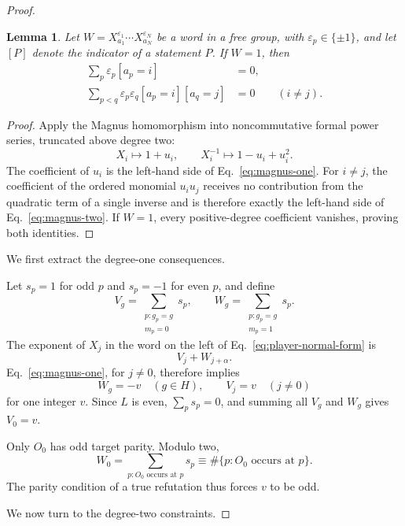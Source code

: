 \documentclass[11pt]{article}
\newtheorem{lemma}[theorem]{Lemma}
\theoremstyle{definition}
\theoremstyle{remark}
\numberwithin{equation}{section}
\begin{document}
\begin{proof}
\begin{lemma}\label{lem:magnus-conditions}
Let \(W=X_{a_1}^{\varepsilon_1}\cdots
X_{a_N}^{\varepsilon_N}\) be a word in a free group, with
\(\varepsilon_p\in\{\pm1\}\), and let \([P]\) denote the indicator of a
statement \(P\).  If \(W=1\), then
\begin{align}
  \sum_p\varepsilon_p[a_p=i]&=0,
  \label{eq:magnus-one}\\
  \sum_{p<q}\varepsilon_p\varepsilon_q
  [a_p=i][a_q=j]&=0
  \qquad(i\ne j).
  \label{eq:magnus-two}
\end{align}
\end{lemma}

\begin{proof}
Apply the Magnus homomorphism into noncommutative formal power series,
truncated above degree two:
\[
  X_i\longmapsto1+u_i,
  \qquad
  X_i^{-1}\longmapsto1-u_i+u_i^2.
\]
The coefficient of \(u_i\) is the left-hand side of
Eq.~\eqref{eq:magnus-one}.  For \(i\ne j\), the coefficient of the ordered
monomial \(u_i u_j\) receives no contribution from the quadratic term of a
single inverse and is therefore exactly the left-hand side of
Eq.~\eqref{eq:magnus-two}.  If \(W=1\), every positive-degree coefficient
vanishes, proving both identities.
\end{proof}

We first extract the degree-one consequences.

Let \(s_p=1\) for odd \(p\) and \(s_p=-1\) for even \(p\), and define
\[
  V_g=\sum_{\substack{p:g_p=g\\m_p=0}}s_p,
  \qquad
  W_g=\sum_{\substack{p:g_p=g\\m_p=1}}s_p.
\]
The exponent of \(X_j\) in the word on the left of
Eq.~\eqref{eq:player-normal-form} is
\[
  V_j+W_{j+\alpha}.
\]
Eq.~\eqref{eq:magnus-one}, for \(j\ne0\), therefore implies
\[
  W_g=-v\quad(g\in H),
  \qquad
  V_j=v\quad(j\ne0)
\]
for one integer \(v\).  Since \(L\) is even,
\(\sum_p s_p=0\), and summing all \(V_g\) and \(W_g\) gives \(V_0=v\).

Only \(O_0\) has odd target parity.  Modulo two,
\[
  W_0
  =
  \sum_{p:O_0\text{ occurs at }p}s_p
  \equiv
  \#\{p:O_0\text{ occurs at }p\}.
\]
The parity condition of a true refutation thus forces \(v\) to be odd.

We now turn to the degree-two constraints.


\end{proof}
\end{document}
